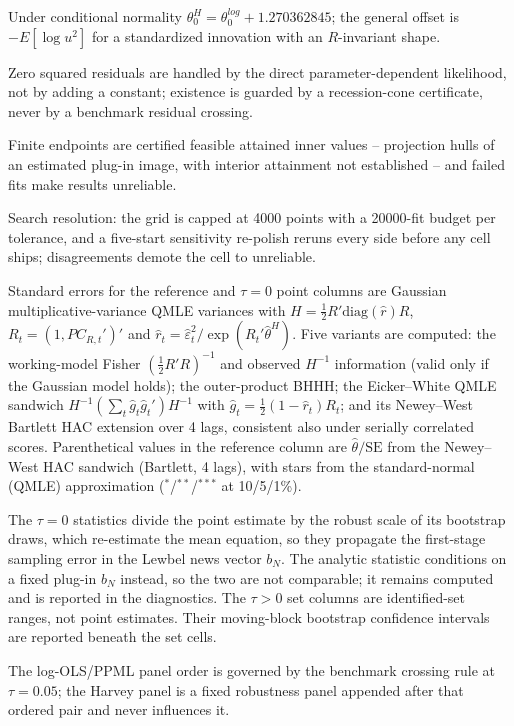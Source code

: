 \documentclass[11pt]{article}
\begin{document}
\begin{table}[!htbp]
\begin{threeparttable}
\begin{tablenotes}[flushleft]
\item Under conditional normality $\theta^{H}_0 = \theta^{log}_0 + 1.270362845$; the general offset is $-E[\log u^2]$ for a standardized innovation with an $R$-invariant shape.
\item Zero squared residuals are handled by the direct parameter-dependent likelihood, not by adding a constant; existence is guarded by a recession-cone certificate, never by a benchmark residual crossing.
\item Finite endpoints are certified feasible attained inner values -- projection hulls of an estimated plug-in image, with interior attainment not established -- and failed fits make results unreliable.
\item Search resolution: the grid is capped at 4000 points with a 20000-fit budget per tolerance, and a five-start sensitivity re-polish reruns every side before any cell ships; disagreements demote the cell to unreliable.
\item Standard errors for the reference and $\tau{=}0$ point columns are Gaussian multiplicative-variance QMLE variances with $H = \frac{1}{2}R'\mathrm{diag}(\hat r)R$, $R_t = (1, PC_{R,t}')'$ and $\hat r_t = \hat\varepsilon_t^2 / \exp(R_t'\hat\theta^{H})$. Five variants are computed: the working-model Fisher $(\frac{1}{2}R'R)^{-1}$ and observed $H^{-1}$ information (valid only if the Gaussian model holds); the outer-product BHHH; the Eicker--White QMLE sandwich $H^{-1} (\sum_t \hat g_t \hat g_t')H^{-1}$ with $\hat g_t = \frac{1}{2}(1 - \hat r_t)R_t$; and its Newey--West Bartlett HAC extension over 4 lags, consistent also under serially correlated scores. Parenthetical values in the reference column are $\hat\theta/\mathrm{SE}$ from the Newey--West HAC sandwich (Bartlett, 4 lags), with stars from the standard-normal (QMLE) approximation ($^{*}$/$^{**}$/$^{***}$ at 10/5/1\%).
\item The $\tau{=}0$ statistics divide the point estimate by the robust scale of its bootstrap draws, which re-estimate the mean equation, so they propagate the first-stage sampling error in the Lewbel news vector $b_N$. The analytic statistic conditions on a fixed plug-in $b_N$ instead, so the two are not comparable; it remains computed and is reported in the diagnostics. The $\tau{>}0$ set columns are identified-set ranges, not point estimates. Their moving-block bootstrap confidence intervals are reported beneath the set cells.
\item The log-OLS/PPML panel order is governed by the benchmark crossing rule at $\tau{=}0.05$; the Harvey panel is a fixed robustness panel appended after that ordered pair and never influences it.

\end{tablenotes}
\end{threeparttable}
\end{table}
\end{document}
